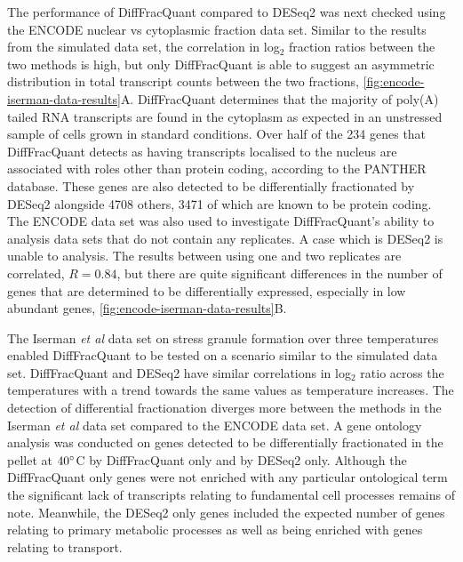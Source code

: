 \documentclass[../main.tex]{subfiles}
\begin{document}
The performance of DiffFracQuant compared to DESeq2 was next checked using the ENCODE nuclear vs cytoplasmic fraction data set. 
Similar to the results from the simulated data set, the correlation in log$_2$ fraction ratios between the two methods is high, but only DiffFracQuant is able to suggest an asymmetric distribution in total transcript counts between the two fractions, \ref{fig:encode-iserman-data-results}A.
DiffFracQuant determines that the majority of poly(A) tailed RNA transcripts are found in the cytoplasm as expected in an unstressed sample of cells grown in standard conditions.
Over half of the 234 genes that DiffFracQuant detects as having transcripts localised to the nucleus are associated with roles other than protein coding, according to the PANTHER database. 
These genes are also detected to be differentially fractionated by DESeq2 alongside 4708 others, 3471 of which are known to be protein coding.
The ENCODE data set was also used to investigate DiffFracQuant's ability to analysis data sets that do not contain any replicates. 
A case which is DESeq2 is unable to analysis.
The results between using one and two replicates are correlated, $R = 0.84$, but there are quite significant differences in the number of genes that are determined to be differentially expressed, especially in low abundant genes, \ref{fig:encode-iserman-data-results}B.

The Iserman \textit{et al} data set on stress granule formation over three temperatures enabled DiffFracQuant to be tested on a scenario similar to the simulated data set. 
DiffFracQuant and DESeq2 have similar correlations in log$_2$ ratio across the temperatures with a trend towards the same values as temperature increases.
The detection of differential fractionation diverges more between the methods in the Iserman \textit{et al} data set compared to the ENCODE data set.
A gene ontology analysis was conducted on genes detected to be differentially fractionated in the pellet at $40\degree$C by DiffFracQuant only and by DESeq2 only.
Although the DiffFracQuant only genes were not enriched with any particular ontological term the significant lack of transcripts relating to fundamental cell processes remains of note.
Meanwhile, the DESeq2 only genes included the expected number of genes relating to primary metabolic processes as well as being enriched with genes relating to transport. 
\end{document}

